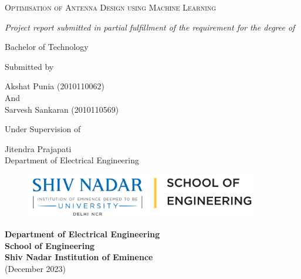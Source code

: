 \documentclass[a4paper,12pt]{report}
\begin{document}
\thispagestyle{empty}
\begin{center}
 \huge{\textsc{Optimisation of Antenna Design using Machine Learning}}
\end{center}
\vspace{0.25cm}
\begin{center}
 \normalsize{\textit{Project report submitted in partial fulfillment of the requirement for the degree of}}
\end{center}
\begin{center}
\large{Bachelor of Technology }
\end{center}
\vspace{0.5cm}
\begin{center}
 \normalsize{Submitted by}
\end{center}
\vspace{0.5cm}
\begin{center}
 \large{Akshat Punia (2010110062)}\\
  \vspace{0.25cm}
 And\\
 \vspace{0.25cm}
 \large{Sarvesh Sankaran (2010110569)}
\end{center}
 \vspace{0.25cm}
\begin{center}
 \large{Under Supervision of}
\end{center}
\vspace{0.25cm}
\begin{center}
 \large{Jitendra Prajapati}\\
 \large{Department of Electrical Engineering}\\
 \vspace{0.25cm}
\end{center}
\begin{figure}[htbp]
	\centering
		\includegraphics[width=4in]{logonew.jpg}	
\end{figure}
\vspace{0.25cm}
\begin{center}
\large{\textbf{Department of Electrical Engineering}}\\
\large{\textbf{School of Engineering}}\\
\large{\textbf{Shiv Nadar Institution of Eminence}}\\
\vspace{0.25cm}
(December 2023)
\end{center}
\end{document}
